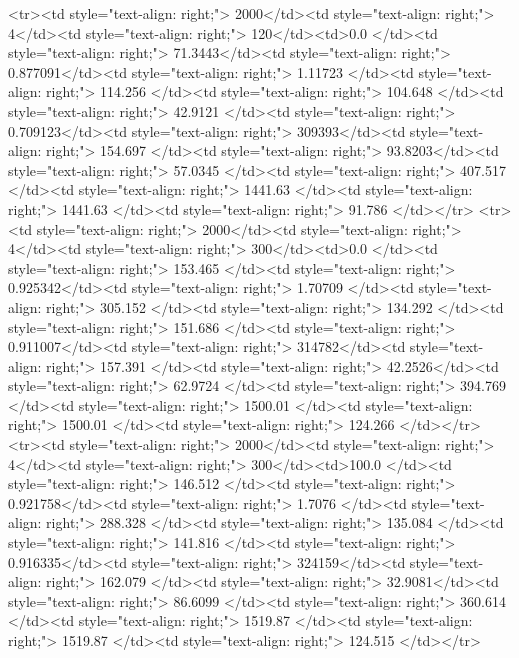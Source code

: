 <tr><td style="text-align: right;">      2000</td><td style="text-align: right;">         4</td><td style="text-align: right;">           120</td><td>0.0          </td><td style="text-align: right;">                71.3443</td><td style="text-align: right;">           0.877091</td><td style="text-align: right;">         1.11723 </td><td style="text-align: right;">        114.256 </td><td style="text-align: right;">           104.648 </td><td style="text-align: right;">              42.9121  </td><td style="text-align: right;">             0.709123</td><td style="text-align: right;">              309393</td><td style="text-align: right;">                      154.697 </td><td style="text-align: right;">            93.8203</td><td style="text-align: right;">                57.0345 </td><td style="text-align: right;">       407.517 </td><td style="text-align: right;">   1441.63 </td><td style="text-align: right;">      1441.63 </td><td style="text-align: right;">                 91.786 </td></tr>
<tr><td style="text-align: right;">      2000</td><td style="text-align: right;">         4</td><td style="text-align: right;">           300</td><td>0.0          </td><td style="text-align: right;">               153.465 </td><td style="text-align: right;">           0.925342</td><td style="text-align: right;">         1.70709 </td><td style="text-align: right;">        305.152 </td><td style="text-align: right;">           134.292 </td><td style="text-align: right;">             151.686   </td><td style="text-align: right;">             0.911007</td><td style="text-align: right;">              314782</td><td style="text-align: right;">                      157.391 </td><td style="text-align: right;">            42.2526</td><td style="text-align: right;">                62.9724 </td><td style="text-align: right;">       394.769 </td><td style="text-align: right;">   1500.01 </td><td style="text-align: right;">      1500.01 </td><td style="text-align: right;">                124.266 </td></tr>
<tr><td style="text-align: right;">      2000</td><td style="text-align: right;">         4</td><td style="text-align: right;">           300</td><td>100.0        </td><td style="text-align: right;">               146.512 </td><td style="text-align: right;">           0.921758</td><td style="text-align: right;">         1.7076  </td><td style="text-align: right;">        288.328 </td><td style="text-align: right;">           135.084 </td><td style="text-align: right;">             141.816   </td><td style="text-align: right;">             0.916335</td><td style="text-align: right;">              324159</td><td style="text-align: right;">                      162.079 </td><td style="text-align: right;">            32.9081</td><td style="text-align: right;">                86.6099 </td><td style="text-align: right;">       360.614 </td><td style="text-align: right;">   1519.87 </td><td style="text-align: right;">      1519.87 </td><td style="text-align: right;">                124.515 </td></tr>

